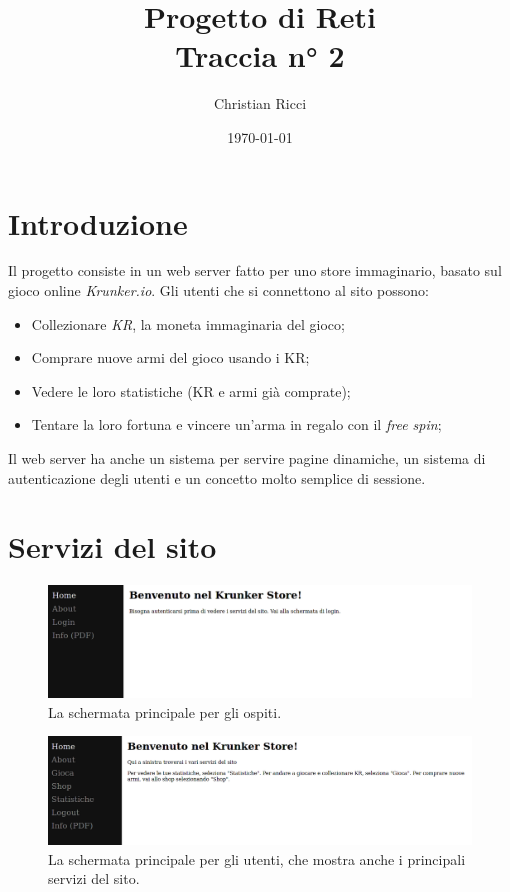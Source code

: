 \documentclass[a4paper,12pt]{report}
\title{Progetto di Reti \\
\large Traccia n° 2}
\author{Christian Ricci}
\date{\today}
\begin{document}
\maketitle
\tableofcontents

\chapter{Introduzione}

Il progetto consiste in un web server fatto per uno store immaginario, basato sul gioco online \textit{Krunker.io}. Gli utenti che si connettono al sito possono: 
\begin{itemize}
\item Collezionare \textit{KR}, la moneta immaginaria del gioco;
\item Comprare nuove armi del gioco usando i KR;
\item Vedere le loro statistiche (KR e armi già comprate);
\item Tentare la loro fortuna e vincere un'arma in regalo con il \textit{free spin};
\end{itemize}

Il web server ha anche un sistema per servire pagine dinamiche, un sistema di autenticazione degli utenti e un concetto molto semplice di sessione.

\chapter{Servizi del sito}

\begin{figure}[h]
\centering{}
\includegraphics[width=\textwidth]{home1.png}
\caption{La schermata principale per gli ospiti.}
\label{img:home_guest}
\end{figure}

\begin{figure}[h]
\centering{}
\includegraphics[width=\textwidth]{home2.png}
\caption{La schermata principale per gli utenti, che mostra anche i principali servizi del sito.}
\label{img:home_user}
\end{figure}
\end{document}
